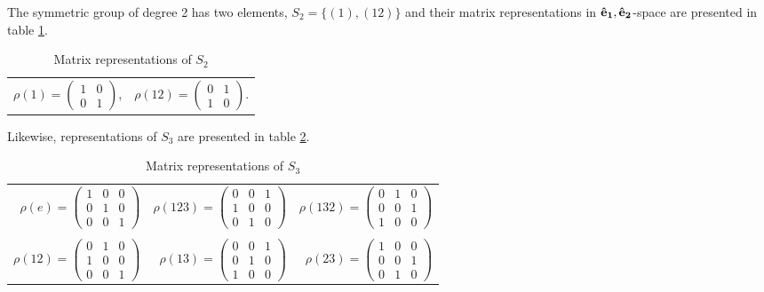 	\begin{example}
		The symmetric group of degree 2 has two elements, $S_2 = \{(1), (12)\}$ and their matrix representations in $\mathbf{\mathbf{\hat{e}}_1},\mathbf{\mathbf{\hat{e}}_2}$-space are presented in table \ref{table:permS2}.
		\begin{table}[hbt!]
			\centering
			\caption{Matrix representations of $S_2$}
			\label{table:permS2}
			\begin{tabular}{c c}
				$\rho(1) =
				\begin{pmatrix}
					1 & 0 \\ 0 & 1
				\end{pmatrix}$, &
				$\rho(12) =
				\begin{pmatrix}
					0 & 1 \\ 1 & 0
				\end{pmatrix}$.
			\end{tabular}
		\end{table}
	\end{example}
	
	\begin{example}
		Likewise, representations of $S_3$ are presented in table \ref{table:permS3}.
		\begin{table}[hbt!]
			\centering
			\caption{Matrix representations of $S_3$}
			\label{table:permS3}
			\begin{tabular}{r r r}
				$\rho(e) = 
				\begin{pmatrix}
					1 & 0 & 0 \\
					0 & 1 & 0 \\
					0 & 0 & 1
				\end{pmatrix}$ & 
				$\rho(123) = 
				\begin{pmatrix}
					0 & 0 & 1 \\
					1 & 0 & 0 \\
					0 & 1 & 0
				\end{pmatrix}$ & 
				$\rho(132) = 
				\begin{pmatrix}
					0 & 1 & 0 \\
					0 & 0 & 1 \\
					1 & 0 & 0
				\end{pmatrix}$ \\ & & \\
				$\rho(12) = 
				\begin{pmatrix}
					0 & 1 & 0 \\
					1 & 0 & 0 \\
					0 & 0 & 1
				\end{pmatrix}$ &
				$\rho(13) = 
				\begin{pmatrix}
					0 & 0 & 1 \\
					0 & 1 & 0 \\
					1 & 0 & 0
				\end{pmatrix}$ &
				$\rho(23) = 
				\begin{pmatrix}
					1 & 0 & 0 \\
					0 & 0 & 1 \\
					0 & 1 & 0
				\end{pmatrix}$
			\end{tabular}
		\end{table}
	\end{example}
		
